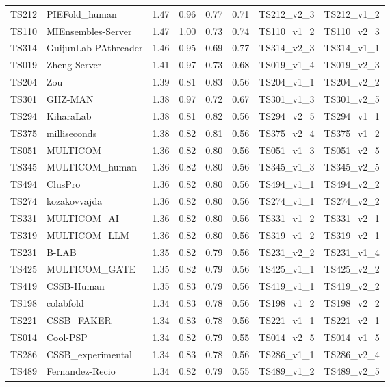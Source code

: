 \begin{longtable}{llllllll}
TS212 & PIEFold\_human & 1.47 & 0.96 & 0.77 & 0.71 & TS212\_v2\_3 & TS212\_v1\_2 \\ 
TS110 & MIEnsembles-Server & 1.47 & 1.00 & 0.73 & 0.74 & TS110\_v1\_2 & TS110\_v2\_3 \\ 
TS314 & GuijunLab-PAthreader & 1.46 & 0.95 & 0.69 & 0.77 & TS314\_v2\_3 & TS314\_v1\_1 \\ 
TS019 & Zheng-Server & 1.41 & 0.97 & 0.73 & 0.68 & TS019\_v1\_4 & TS019\_v2\_3 \\ 
TS204 & Zou & 1.39 & 0.81 & 0.83 & 0.56 & TS204\_v1\_1 & TS204\_v2\_2 \\ 
TS301 & GHZ-MAN & 1.38 & 0.97 & 0.72 & 0.67 & TS301\_v1\_3 & TS301\_v2\_5 \\ 
TS294 & KiharaLab & 1.38 & 0.81 & 0.82 & 0.56 & TS294\_v2\_5 & TS294\_v1\_1 \\ 
TS375 & milliseconds & 1.38 & 0.82 & 0.81 & 0.56 & TS375\_v2\_4 & TS375\_v1\_2 \\ 
TS051 & MULTICOM & 1.36 & 0.82 & 0.80 & 0.56 & TS051\_v1\_3 & TS051\_v2\_5 \\ 
TS345 & MULTICOM\_human & 1.36 & 0.82 & 0.80 & 0.56 & TS345\_v1\_3 & TS345\_v2\_5 \\ 
TS494 & ClusPro & 1.36 & 0.82 & 0.80 & 0.56 & TS494\_v1\_1 & TS494\_v2\_2 \\ 
TS274 & kozakovvajda & 1.36 & 0.82 & 0.80 & 0.56 & TS274\_v1\_1 & TS274\_v2\_2 \\ 
TS331 & MULTICOM\_AI & 1.36 & 0.82 & 0.80 & 0.56 & TS331\_v1\_2 & TS331\_v2\_1 \\ 
TS319 & MULTICOM\_LLM & 1.36 & 0.82 & 0.80 & 0.56 & TS319\_v1\_2 & TS319\_v2\_1 \\ 
TS231 & B-LAB & 1.35 & 0.82 & 0.79 & 0.56 & TS231\_v2\_2 & TS231\_v1\_4 \\ 
TS425 & MULTICOM\_GATE & 1.35 & 0.82 & 0.79 & 0.56 & TS425\_v1\_1 & TS425\_v2\_2 \\ 
TS419 & CSSB-Human & 1.35 & 0.83 & 0.79 & 0.56 & TS419\_v1\_1 & TS419\_v2\_2 \\ 
TS198 & colabfold & 1.34 & 0.83 & 0.78 & 0.56 & TS198\_v1\_2 & TS198\_v2\_2 \\ 
TS221 & CSSB\_FAKER & 1.34 & 0.83 & 0.78 & 0.56 & TS221\_v1\_1 & TS221\_v2\_1 \\ 
TS014 & Cool-PSP & 1.34 & 0.82 & 0.79 & 0.55 & TS014\_v2\_5 & TS014\_v1\_5 \\ 
TS286 & CSSB\_experimental & 1.34 & 0.83 & 0.78 & 0.56 & TS286\_v1\_1 & TS286\_v2\_4 \\ 
TS489 & Fernandez-Recio & 1.34 & 0.82 & 0.79 & 0.55 & TS489\_v1\_2 & TS489\_v2\_5 \\ 

\end{longtable}
